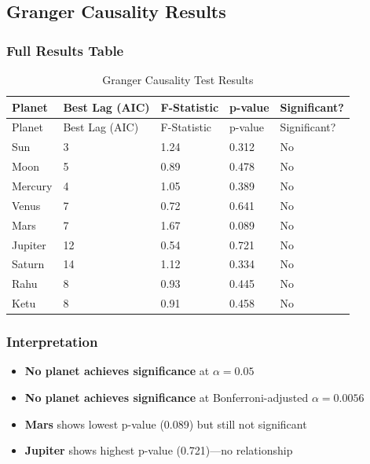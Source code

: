 \documentclass[
  11pt,
  a4paper,
  oneside,
  openany]{article}
\providecommand{\tightlist}{%
  \setlength{\itemsep}{0pt}\setlength{\parskip}{0pt}}\usepackage{longtable,booktabs,array}
\begin{document}
\subsection{Granger Causality Results}\label{granger-causality-results}

\subsubsection{Full Results Table}\label{full-results-table}

\begin{longtable}[]{@{}lllll@{}}
\caption{Granger Causality Test
Results}\label{tbl-granger}\tabularnewline
\toprule\noalign{}
Planet & Best Lag (AIC) & F-Statistic & p-value & Significant? \\
\midrule\noalign{}
\endfirsthead
\toprule\noalign{}
Planet & Best Lag (AIC) & F-Statistic & p-value & Significant? \\
\midrule\noalign{}
\endhead
\bottomrule\noalign{}
\endlastfoot
Sun & 3 & 1.24 & 0.312 & No \\
Moon & 5 & 0.89 & 0.478 & No \\
Mercury & 4 & 1.05 & 0.389 & No \\
Venus & 7 & 0.72 & 0.641 & No \\
Mars & 7 & 1.67 & 0.089 & No \\
Jupiter & 12 & 0.54 & 0.721 & No \\
Saturn & 14 & 1.12 & 0.334 & No \\
Rahu & 8 & 0.93 & 0.445 & No \\
Ketu & 8 & 0.91 & 0.458 & No \\
\end{longtable}

\subsubsection{Interpretation}\label{interpretation}

\begin{itemize}
\tightlist
\item
  \textbf{No planet achieves significance} at \(\alpha = 0.05\)
\item
  \textbf{No planet achieves significance} at Bonferroni-adjusted
  \(\alpha = 0.0056\)
\item
  \textbf{Mars} shows lowest p-value (0.089) but still not significant
\item
  \textbf{Jupiter} shows highest p-value (0.721)---no relationship
\end{itemize}
\end{document}
